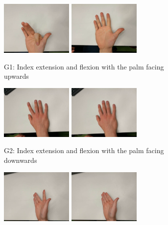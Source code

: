 \begin{figure}
  \begin{subfigure}[t]{0.5\linewidth}
  \includegraphics[width=100pt]{figures/ext_index1}
  \includegraphics[width=100pt]{figures/flx_index1}
  \caption{G1: Index extension and flexion with the palm facing upwards}
  \end{subfigure}
  \hspace*{\fill}
  \begin{subfigure}[t]{0.5\linewidth}
  \includegraphics[width=100pt]{figures/ext_index2}
  \includegraphics[width=100pt]{figures/flx_index2}
  \caption{G2: Index extension and flexion with the palm facing downwards}
  \end{subfigure}\par\medskip
  \begin{subfigure}[t]{0.5\linewidth}
  \includegraphics[width=100pt]{figures/ext_indextopair}
  \includegraphics[width=100pt]{figures/flx_indextopair}

\end{subfigure}
\end{figure}
